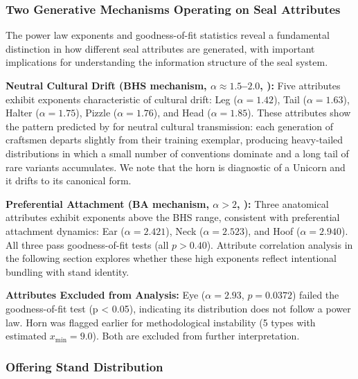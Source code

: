 \documentclass[12pt]{article}
\begin{document}
\subsubsection{Two Generative Mechanisms Operating on Seal Attributes}

The power law exponents and goodness-of-fit statistics reveal a fundamental
distinction in how different seal attributes are generated, with important
implications for understanding the information structure of the seal system.

\textbf{Neutral Cultural Drift (BHS mechanism, $\alpha \approx 1.5$--$2.0$,
\citet{bentley2004random}):} Five
attributes exhibit exponents characteristic of cultural drift: Leg
($\alpha = 1.42$), Tail ($\alpha = 1.63$), Halter ($\alpha = 1.75$),
Pizzle ($\alpha = 1.76$), and Head ($\alpha = 1.85$). These attributes
show the pattern predicted by \citet{bentley2004random} for neutral
cultural transmission: each generation of craftsmen departs slightly
from their training exemplar, producing heavy-tailed distributions in
which a small number of conventions dominate and a long tail of rare
variants accumulates. We note that the horn is diagnostic of a Unicorn
and it drifts to its canonical form.


\textbf{Preferential Attachment (BA mechanism, $\alpha > 2$,
\citet{barabasi1999emergence}):} Three anatomical attributes exhibit
exponents above the BHS range, consistent with preferential attachment
dynamics: Ear ($\alpha = 2.421$), Neck ($\alpha = 2.523$), and Hoof
($\alpha = 2.940$). All three pass goodness-of-fit tests (all $p > 0.40$).
Attribute correlation analysis in the following section explores whether
these high exponents reflect intentional bundling with stand identity.

\textbf{Attributes Excluded from Analysis:} Eye ($\alpha = 2.93$, $p = 0.0372$)
failed the goodness-of-fit test (p < 0.05), indicating its distribution does not
follow a power law. Horn was flagged earlier for methodological instability (5
types with estimated $x_{\min} = 9.0$). Both are excluded from further
interpretation.

\subsubsection{Offering Stand Distribution}
\label{subsubsec:offering_stands}
\end{document}
